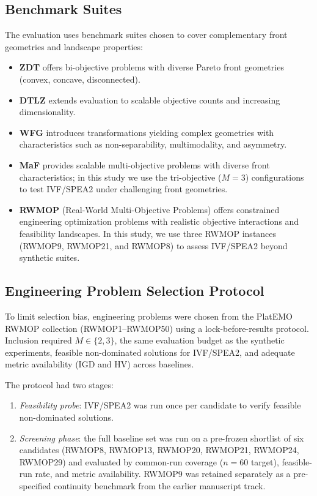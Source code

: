 \documentclass[pdflatex,sn-mathphys-ay]{sn-jnl}%
\theoremstyle{thmstyleone}%
\theoremstyle{thmstyletwo}%
\theoremstyle{thmstylethree}%
\begin{document}
\subsection{Benchmark Suites}\label{subsec:benchmarks}
The evaluation uses benchmark suites chosen to cover complementary front geometries and landscape properties:
\begin{itemize}
	\item \textbf{ZDT} \citep{zitzler2000comparison} offers bi-objective problems with diverse Pareto front geometries (convex, concave, disconnected).
	\item \textbf{DTLZ} \citep{deb2005scalable} extends evaluation to scalable objective counts and increasing dimensionality.
	\item \textbf{WFG} \citep{huband2006review} introduces transformations yielding complex geometries with characteristics such as non-separability, multimodality, and asymmetry.
	\item \textbf{MaF} \citep{cheng2017benchmark} provides scalable multi-objective problems with diverse front characteristics; in this study we use the tri-objective ($M=3$) configurations to test IVF/SPEA2 under challenging front geometries.
	\item \textbf{RWMOP} (Real-World Multi-Objective Problems) \citep{kumar2021benchmark} offers constrained engineering optimization problems with realistic objective interactions and feasibility landscapes. In this study, we use three RWMOP instances (RWMOP9, RWMOP21, and RWMOP8) to assess IVF/SPEA2 beyond synthetic suites.
\end{itemize}

\subsection{Engineering Problem Selection Protocol}\label{subsec:engineering-selection}
To limit selection bias, engineering problems were chosen from the PlatEMO RWMOP collection (RWMOP1--RWMOP50) using a lock-before-results protocol. Inclusion required $M\in\{2,3\}$, the same evaluation budget as the synthetic experiments, feasible non-dominated solutions for IVF/SPEA2, and adequate metric availability (IGD and HV) across baselines.

The protocol had two stages:
\begin{enumerate}
	\item \emph{Feasibility probe}: IVF/SPEA2 was run once per candidate to verify feasible non-dominated solutions.
	\item \emph{Screening phase}: the full baseline set was run on a pre-frozen shortlist of six candidates (RWMOP8, RWMOP13, RWMOP20, RWMOP21, RWMOP24, RWMOP29) and evaluated by common-run coverage ($n=60$ target), feasible-run rate, and metric availability. RWMOP9 was retained separately as a pre-specified continuity benchmark from the earlier manuscript track.
\end{enumerate}
\end{document}
